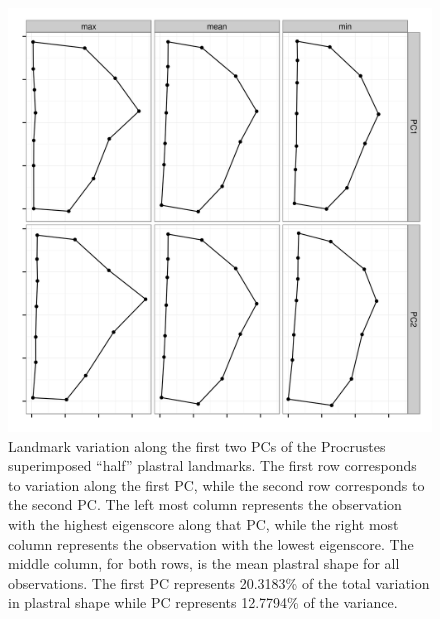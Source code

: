 \documentclass[12pt,letterpaper]{article}\usepackage{graphicx, color}
\begin{document}
\begin{figure}[ht]
  \centering
  \includegraphics[width = \textwidth]{figure/pc_var}
  \caption{Landmark variation along the first two PCs of the Procrustes superimposed ``half'' plastral landmarks. The first row corresponds to variation along the first PC, while the second row corresponds to the second PC. The left most column represents the observation with the highest eigenscore along that PC, while the right most column represents the observation with the lowest eigenscore. The middle column, for both rows, is the mean plastral shape for all observations. The first PC represents 20.3183\% of the total variation in plastral shape while PC represents 12.7794\% of the variance.}
  \label{fig:pc_var}
\end{figure}
\end{document}
